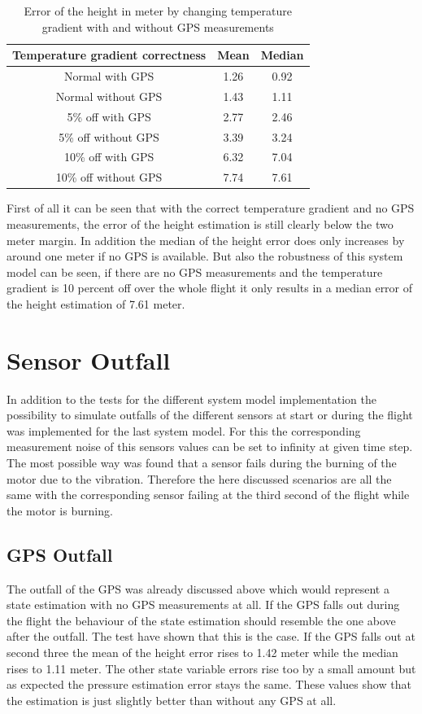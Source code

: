 \begin{table}[h!]
\centering
\begin{tabular}{ccc}
\hline
\multicolumn{1}{|c|}{Temperature gradient correctness} & \multicolumn{1}{|c|}{Mean}& \multicolumn{1}{|c|}{Median} \\ \hline
Normal with GPS 	& 1.26 		& 0.92\\
Normal without GPS	& 1.43	 	& 1.11\\
5\% off with GPS 	& 2.77	 	& 2.46\\
5\% off without GPS 	& 3.39	 	& 3.24\\
10\% off with GPS 	& 6.32	 	& 7.04\\
10\% off without GPS 	& 7.74 		& 7.61
\end{tabular}
\caption{Error of the height in meter by changing temperature gradient with and without GPS measurements}
\label{tab:ErrorChangingTempGradWithWithoutGPS}
\end{table}

First of all it can be seen that with the correct temperature gradient and no GPS measurements,
the error of the height estimation is still clearly below the two meter margin.
In addition the median of the height error does only increases by around one meter if no GPS is available.
But also the robustness of this system model can be seen, if there are no GPS measurements
and the temperature gradient is 10 percent off over the whole flight it only results in a median error of the height estimation of 7.61 meter.

\section{Sensor Outfall}
In addition to the tests for the different system model implementation
the possibility to simulate outfalls of the different sensors at start or during the flight was implemented for the last system model.
For this the corresponding measurement noise of this sensors values can be set to infinity at given time step.
The most possible way was found that a sensor fails during the burning of the motor due to the vibration.
Therefore the here discussed scenarios are all the same with the corresponding sensor failing at the third second of the flight while the motor is burning.

\subsection{GPS Outfall}
The outfall of the GPS was already discussed above which would represent a state estimation with no GPS measurements at all.
If the GPS falls out during the flight the behaviour of the state estimation should resemble the one above after the outfall.
The test have shown that this is the case.
If the GPS falls out at second three the mean of the height error rises to 1.42 meter while the median rises to 1.11 meter.
The other state variable errors rise too by a small amount but as expected the pressure estimation error stays the same.
These values show that the estimation is just slightly better than without any GPS at all.

